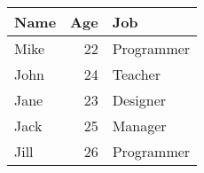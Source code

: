 \begin{tabular}{lrl}
\hline
 Name   &   Age & Job        \\
\hline
 Mike   &    22 & Programmer \\
 John   &    24 & Teacher    \\
 Jane   &    23 & Designer   \\
 Jack   &    25 & Manager    \\
 Jill   &    26 & Programmer \\
\hline
\end{tabular}